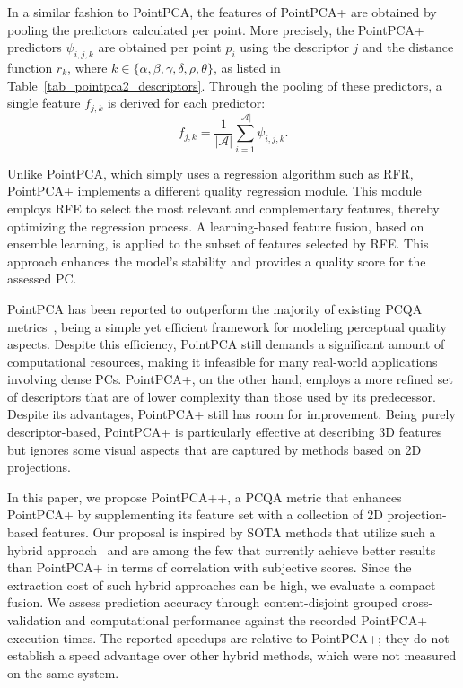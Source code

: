\documentclass[final,3p,times,twocolumn]{elsarticle}
\begin{document}
In a similar fashion to PointPCA, the features of PointPCA+ are obtained by pooling the predictors calculated per point. More precisely, the PointPCA+ predictors $\psi_{i,j,k}$ are obtained per point $p_i$ using the descriptor $j$ and the distance function $r_k$, where $k \in \{ \alpha, \beta, \gamma, \delta, \rho, \theta \}$, as listed in Table~\ref{tab_pointpca2_descriptors}. Through the pooling of these predictors, a single feature $f_{j,k}$ is derived for each predictor:
\begin{equation}  \label{eq_pointpca2_feats}
    f_{j,k} = \frac{1}{| \mathcal{A} |} \sum_{i=1}^{| \mathcal{A} |}  \psi_{i,j,k}.
\end{equation}

Unlike PointPCA, which simply uses a regression algorithm such as \gls{RFR}, PointPCA+ implements a different quality regression module. This module employs \gls{RFE} to select the most relevant and complementary features, thereby optimizing the regression process. A learning-based feature fusion, based on ensemble learning, is applied to the subset of features selected by \gls{RFE}. This approach enhances the model's stability and provides a quality score for the assessed \gls{PC}.

PointPCA has been reported to outperform the majority of existing \gls{PCQA} metrics~\cite{alexiou2024pointpca}, being a simple yet efficient framework for modeling perceptual quality aspects. Despite this efficiency, PointPCA still demands a significant amount of computational resources, making it infeasible for many real-world applications involving dense \glspl{PC}. PointPCA+, on the other hand, employs a more refined set of descriptors that are of lower complexity than those used by its predecessor. Despite its advantages, PointPCA+ still has room for improvement. Being purely descriptor-based, PointPCA+ is particularly effective at describing \gls{3D} features but ignores some visual aspects that are captured by methods based on 2D projections.


In this paper, we propose PointPCA++, a \gls{PCQA} metric that enhances PointPCA+ by supplementing its feature set with a collection of 2D projection-based features. Our proposal is inspired by \gls{SOTA} methods that utilize such a hybrid approach~\cite{Javaheri2022joint, freitas2023point, Cui2024Colored} and are among the few that currently achieve better results than PointPCA+ in terms of correlation with subjective scores. Since the extraction cost of such hybrid approaches can be high, we evaluate a compact fusion. We assess prediction accuracy through content-disjoint grouped cross-validation and computational performance against the recorded PointPCA+ execution times. The reported speedups are relative to PointPCA+; they do not establish a speed advantage over other hybrid methods, which were not measured on the same system.
\end{document}
